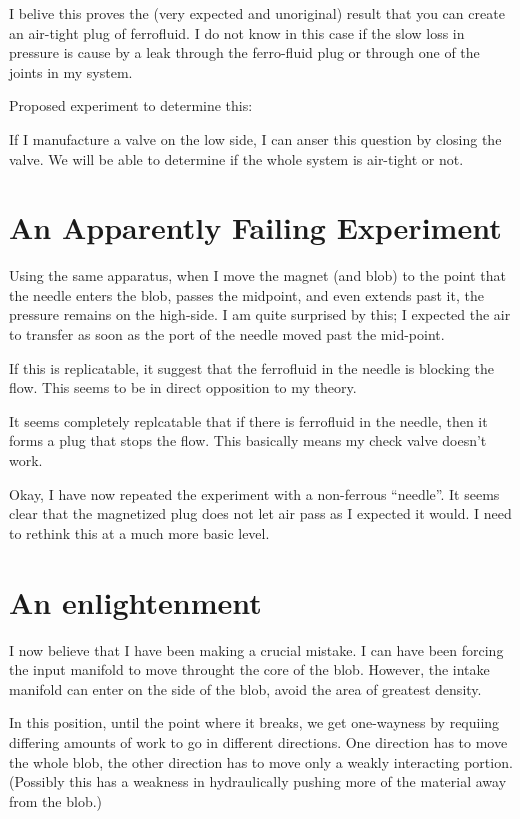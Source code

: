 \documentclass{article}
\begin{document}
I belive this proves the (very expected and unoriginal) result that you can create an air-tight plug of ferrofluid.
I do not know in this case if the slow loss in pressure is cause by a leak through the ferro-fluid plug or through
one of the joints in my system.

Proposed experiment to determine this:

If I manufacture a valve on the low side, I can anser this question by closing the valve.  We will be able
to determine if the whole system is air-tight or not.

\section{An Apparently Failing Experiment}

Using the same apparatus, when I move the magnet (and blob) to the point that the needle enters the blob,
passes the midpoint, and even extends past it, the pressure remains on the high-side.  I am quite surprised
by this; I expected the air to transfer as soon as the port of the needle moved past the mid-point.

If this is replicatable, it suggest that the ferrofluid in the needle is blocking the flow. This
seems to be in direct opposition to my theory.

It seems completely replcatable that if there is ferrofluid in the needle, then it forms a plug
that stops the flow.  This basically means my check valve doesn't work.

Okay, I have now repeated the experiment with a non-ferrous ``needle''.  It seems clear that the magnetized plug
does not let air pass as I expected it would.  I need to rethink this at a much more basic level.

\section{An enlightenment}

I now believe that I have been making a crucial mistake.  I can have been forcing the input manifold
to move throught the core of the blob. However, the intake manifold can enter on the side of the blob,
avoid the area of greatest density.

In this position, until the point where it breaks, we get one-wayness by requiing differing amounts of
work to go in different directions.  One direction has to move the whole blob, the other direction
has to move only a weakly interacting portion.  (Possibly this has a weakness in hydraulically pushing
more of the material away from the blob.)
\end{document}
